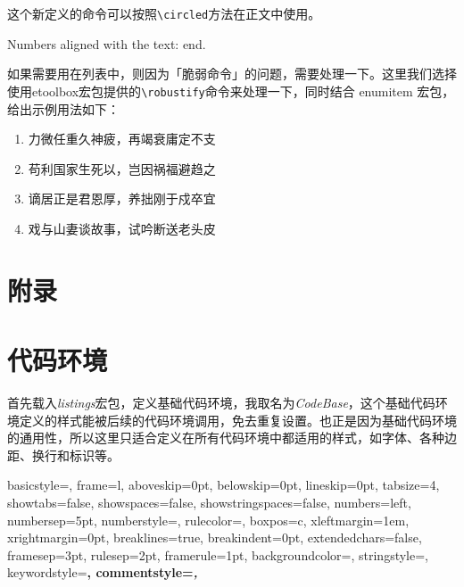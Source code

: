\begin{latex}
\usepackage{tikz}
\usepackage{etoolbox}
\newcommand{\circled}[2][]{\tikz[baseline=(char.base)]
    {\node[shape = circle, draw, inner sep = 1pt]
        (char) {\phantom{\ifblank{#1}{#2}{#1}}};%
        \node at (char.center) {\makebox[0pt][c]{#2}};}}
\robustify{\circled}
\end{latex}

这个新定义的命令可以按照\lstinline|\circled|方法在正文中使用。

\begin{codeshow}
Numbers aligned with the text:     end.
\end{codeshow}

如果需要用在列表中，则因为「脆弱命令」的问题，需要处理一下。这里我们选择使用etoolbox宏包提供的\lstinline|\robustify|命令来处理一下，同时结合 enumitem 宏包，给出示例用法如下：

\begin{codeshow}
\begin{enumerate}[label=\dcircled{\arabic*}, noitemsep]
    \item 力微任重久神疲，再竭衰庸定不支
    \item 苟利国家生死以，岂因祸福避趋之
    \item 谪居正是君恩厚，养拙刚于戍卒宜
    \item 戏与山妻谈故事，试吟断送老头皮
\end{enumerate}
\end{codeshow}


\section{附录}

\section{代码环境}

首先载入\emph{listings}宏包，定义基础代码环境，我取名为\emph{CodeBase}，这个基础代码环境定义的样式能被后续的代码环境调用，免去重复设置。也正是因为基础代码环境的通用性，所以这里只适合定义在所有代码环境中都适用的样式，如字体、各种边距、换行和标识等。

\begin{latex}
{
    basicstyle=\small\ttfamily,
    frame=l,
    aboveskip=0pt,%
    belowskip=0pt,%
    lineskip=0pt,
    tabsize=4,%
    showtabs=false,%
    showspaces=false,%
    showstringspaces=false,
    numbers=left,
    numbersep=5pt,%
    numberstyle=\small\ttfamily,
    rulecolor=\color{cyan},
    boxpos=c,
    xleftmargin=1em,%
    xrightmargin=0pt,
    breaklines=true,%
    breakindent=0pt,%
    extendedchars=false,%
    framesep=3pt,
    rulesep=2pt,
    framerule=1pt,
    backgroundcolor=\color{gray!5},
    stringstyle=\color{green!40!black!100},
    keywordstyle=\bfseries\color[RGB]{0,0,255},
    commentstyle=\slshape\color{black!60},
}
\end{latex}

